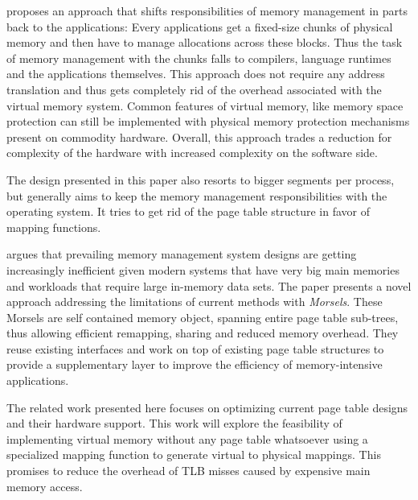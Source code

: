 
\cite{zagieboylo2020cost} proposes an approach that shifts responsibilities of memory management in
parts back to the applications: Every applications get a fixed-size chunks of physical memory and then have to manage allocations across these blocks.
Thus the task of memory management with the chunks falls to compilers, language runtimes and the applications themselves.
This approach does not require any address translation and thus gets completely rid of the overhead associated with the virtual memory system.
Common features of virtual memory, like memory space protection can still be implemented with physical memory protection mechanisms present on commodity hardware.
Overall, this approach trades a reduction for complexity of the hardware with increased complexity on the software side.

The design presented in this paper also resorts to bigger segments per process, but generally aims to keep the memory management responsibilities with the operating system. It tries to get rid of the page table structure in favor of mapping functions.


\cite{halbuer2023morsels} argues that prevailing memory management system designs are getting increasingly inefficient given modern systems that have very big main memories and workloads that require large in-memory data sets.
The paper presents a novel approach addressing the limitations of current methods with \emph{Morsels}.
These Morsels are self contained memory object, spanning entire page table sub-trees, thus allowing efficient remapping, sharing and reduced memory overhead.
They reuse existing interfaces and work on top of existing page table structures to provide a supplementary layer to improve the efficiency of memory-intensive applications.


The related work presented here focuses on optimizing current page table designs and their hardware
support. This work will explore the feasibility of implementing virtual memory without any page table whatsoever using a specialized mapping function to generate virtual to physical mappings.
This promises to reduce the overhead of TLB misses caused by expensive main memory access.


